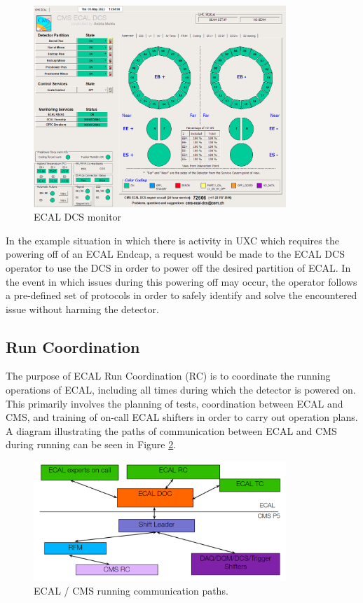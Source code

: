 \begin{figure}[H]
    \centering
    \includegraphics[width=0.85\textwidth]{Images/ECAL_Operations/ECAL_DCS.png}
    \caption{ECAL DCS monitor}
    \label{fig:ECAL_DCS_Monitor}
\end{figure}

In the example situation in which there is activity in UXC which requires the powering off of an ECAL Endcap, a request would be made to the ECAL DCS operator to use the DCS in order to power off the desired partition of ECAL. In the event in which issues during this powering off may occur, the operator follows a pre-defined set of protocols in order to safely identify and solve the encountered issue without harming the detector.  

\subsection{Run Coordination}

The purpose of ECAL Run Coordination (RC) is to coordinate the running operations of ECAL, including all times during which the detector is powered on. This primarily involves the planning of tests, coordination between ECAL and CMS, and training of on-call ECAL shifters in order to carry out operation plans. A diagram illustrating the paths of communication between ECAL and CMS during running can be seen in Figure \ref{fig:ECAL_CMS_RC_diagram}.

\begin{figure}[H]
    \centering
    \includegraphics[width=0.85\textwidth]{Images/ECAL_Operations/ECAL_RC_Diagram.png}
    \caption{ECAL / CMS running communication paths.}
    \label{fig:ECAL_CMS_RC_diagram}
\end{figure}

